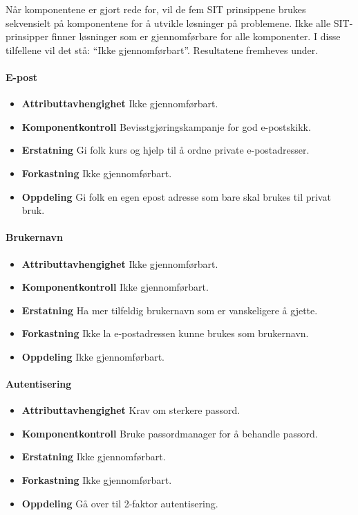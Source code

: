 Når komponentene er gjort rede for, vil de fem SIT prinsippene brukes sekvensielt på komponentene for å utvikle løsninger på problemene. Ikke alle SIT-prinsipper finner løsninger som er gjennomførbare for alle komponenter. I disse tilfellene vil det stå: ``Ikke gjennomførbart''. Resultatene fremheves under.

\paragraph{E-post}
\begin{itemize}
    \item \textbf{Attributtavhengighet} Ikke gjennomførbart.
    \item \textbf{Komponentkontroll} Bevisstgjøringskampanje for god e-postskikk.
    \item \textbf{Erstatning} Gi folk kurs og hjelp til å ordne private e-postadresser.
    \item \textbf{Forkastning} Ikke gjennomførbart.
    \item \textbf{Oppdeling} Gi folk en egen epost adresse som bare skal brukes til privat bruk.
\end{itemize}

\paragraph{Brukernavn}
\begin{itemize}
    \item \textbf{Attributtavhengighet} Ikke gjennomførbart.
    \item \textbf{Komponentkontroll} Ikke gjennomførbart.
    \item \textbf{Erstatning} Ha mer tilfeldig brukernavn som er vanskeligere å gjette.
    \item \textbf{Forkastning} Ikke la e-postadressen kunne brukes som brukernavn.
    \item \textbf{Oppdeling} Ikke gjennomførbart.
\end{itemize}

\paragraph{Autentisering}
\begin{itemize}
    \item \textbf{Attributtavhengighet} Krav om sterkere passord.
    \item \textbf{Komponentkontroll} Bruke passordmanager for å behandle passord. 
    \item \textbf{Erstatning} Ikke gjennomførbart.
    \item \textbf{Forkastning} Ikke gjennomførbart.
    \item \textbf{Oppdeling} Gå over til 2-faktor autentisering.
\end{itemize}

